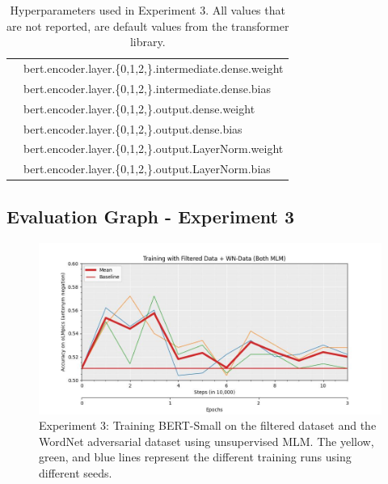 \documentclass{article}
\begin{document}
\begin{table}[!h]
\begin{tabular}{r|l}
                      &      bert.encoder.layer.\{0,1,2,\}.intermediate.dense.weight \\
                      &      bert.encoder.layer.\{0,1,2,\}.intermediate.dense.bias \\
                      &      bert.encoder.layer.\{0,1,2,\}.output.dense.weight \\
                      &      bert.encoder.layer.\{0,1,2,\}.output.dense.bias \\
                      &      bert.encoder.layer.\{0,1,2,\}.output.LayerNorm.weight \\
                      &      bert.encoder.layer.\{0,1,2,\}.output.LayerNorm.bias \\
    \end{tabular}
    \caption{Hyperparameters used in Experiment 3. All values that are not reported, are default values from the transformer library.}
    \label{tab:hyp_exp3}
\end{table}

\newpage

\subsection{Evaluation Graph - Experiment 3}
\begin{figure}[!h]
    \centering
    \includegraphics[width=\textwidth]{figures/FiltWNMixed.jpg}
    \caption[width=\textwidth]{Experiment 3: Training BERT-Small on the filtered dataset and the WordNet adversarial dataset using unsupervised MLM. The yellow, green, and blue lines represent the different training runs using different seeds.}
    \label{fig:graph_exp3}
\end{figure}
\newpage
\end{document}
